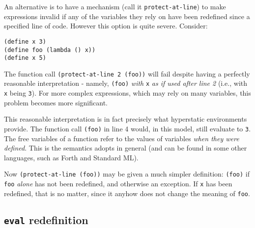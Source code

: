 An alternative is to have a mechanism (call it \texttt{protect-at-line}) to
make expressions invalid if any of the variables they rely on have been
redefined since a specified line of code.
However this option is quite severe. Consider:
\begin{lstlisting}
(define x 3)
(define foo (lambda () x))
(define x 5)
\end{lstlisting}
The function call \texttt{(protect-at-line 2 (foo))} will fail despite having a
perfectly reasonable interpretation - namely, \texttt{(foo)} \emph{with}
\texttt{x} \emph{as if used after line 2} (i.e., with \texttt{x} being
\texttt{3}). For more complex expressions, which may rely on many variables,
this problem becomes more significant.

This reasonable interpretation is in fact precisely what hyperstatic
environments provide. The function call \texttt{(foo)} in line 4 would, in this
model, still evaluate to \texttt{3}. The free variables of a function refer to
the values of variables \emph{when they were defined}. This is the semantics
\rad{} adopts in general (and can be found in some other languages, such as
Forth and Standard ML\cite{SML1997}).

Now \texttt{(protect-at-line (foo))} may be given a much simpler definition:
\texttt{(foo)} if \texttt{foo} \emph{alone} has not been redefined, and otherwise
an exception. If \texttt{x} has been redefined, that is no matter, since it
anyhow does not change the meaning of \texttt{foo}.


\subsection{\texttt{eval} redefinition}

